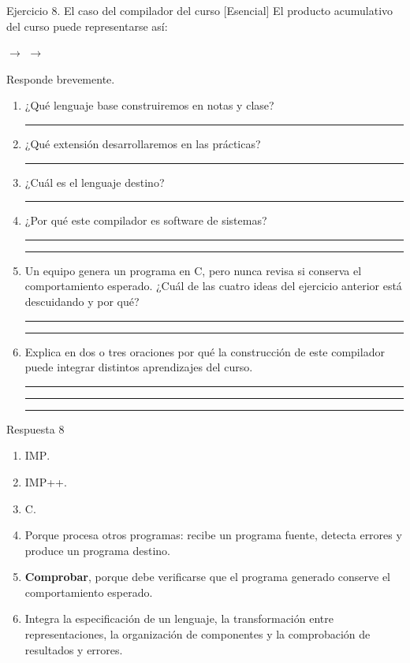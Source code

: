 \documentclass[11pt,spanish]{article}
\newcommand{\blank}[1][4cm]{\rule{#1}{0.4pt}}
\begin{document}
\begin{ejercicio}{Ejercicio 8. El caso del compilador del curso \hfill {\small [Esencial]}}
El producto acumulativo del curso puede representarse así:

\begin{center}
\(\longrightarrow\)
\(\longrightarrow\)
\end{center}

Responde brevemente.

\begin{enumerate}[leftmargin=*]
    \item ¿Qué lenguaje base construiremos en notas y clase? \blank[4.5cm]
    \item ¿Qué extensión desarrollaremos en las prácticas? \blank[4.5cm]
    \item ¿Cuál es el lenguaje destino? \blank[5cm]
    \item ¿Por qué este compilador es software de sistemas?

    \ifrespuestas\else
    \blank[14cm]

    \blank[14cm]
    \fi

    \item Un equipo genera un programa en \textsc{C}, pero nunca revisa si conserva el comportamiento esperado. ¿Cuál de las cuatro ideas del ejercicio anterior está descuidando y por qué?

    \ifrespuestas\else
    \blank[14cm]

    \blank[14cm]
    \fi

    \item Explica en dos o tres oraciones por qué la construcción de este compilador puede integrar distintos aprendizajes del curso.

    \ifrespuestas\else
    \blank[14cm]

    \blank[14cm]

    \blank[14cm]
    \fi
\end{enumerate}
\end{ejercicio}

\ifrespuestas
\begin{respuesta}{Respuesta 8}
\begin{enumerate}[leftmargin=*]
    \item \textsc{IMP}.
    \item \textsc{IMP++}.
    \item \textsc{C}.
    \item Porque procesa otros programas: recibe un programa fuente, detecta errores y produce un programa destino.
    \item \textbf{Comprobar}, porque debe verificarse que el programa generado conserve el comportamiento esperado.
    \item Integra la especificación de un lenguaje, la transformación entre representaciones, la organización de componentes y la comprobación de resultados y errores.
\end{enumerate}
\end{respuesta}
\fi
\end{document}
